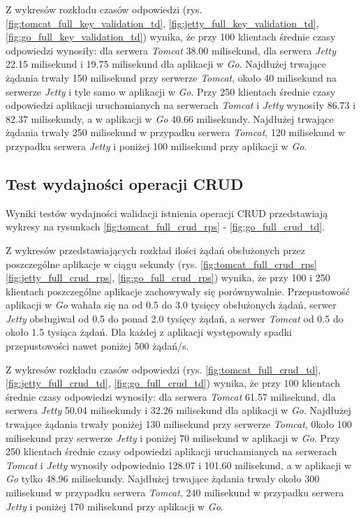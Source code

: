 Z wykresów rozkładu czasów odpowiedzi (rys. \ref{fig:tomcat_full_key_validation_td}, \ref{fig:jetty_full_key_validation_td}, \ref{fig:go_full_key_validation_td}) wynika, że przy 100 klientach średnie czasy odpowiedzi wynosiły: dla serwera \textsl{Tomcat} 38.00 milisekund, dla serwera \textsl{Jetty} 22.15 milisekund i 19.75 milisekund dla aplikacji w \textsl{Go}. Najdłużej trwające żądania trwały 150 milisekund przy serwerze  \textsl{Tomcat}, około 40 milisekund na serwerze \textsl{Jetty} i tyle samo w aplikacji w \textsl{Go}. Przy 250 klientach średnie czasy odpowiedzi aplikacji uruchamianych na serwerach \textsl{Tomcat} i \textsl{Jetty} wynosiły 86.73 i 82.37 milisekundy, a w aplikacji w \textsl{Go} 40.66 milisekundy. Najdłużej trwające żądania trwały 250 milisekund w przypadku serwera  \textsl{Tomcat}, 120 milisekund w przypadku serwera \textsl{Jetty} i poniżej 100  milisekund przy aplikacji w \textsl{Go}.

% 
\clearpage

\subsection{Test wydajności operacji CRUD}

Wyniki testów wydajności walidacji istnienia operacji CRUD przedstawiają wykresy na rysunkach \ref{fig:tomcat_full_crud_rps} - \ref{fig:go_full_crud_td}.

Z wykresów przedstawiających rozkład ilości żądań obsłużonych przez poszczególne aplikacje w ciągu sekundy (rys. \ref{fig:tomcat_full_crud_rps} \ref{fig:jetty_full_crud_rps}, \ref{fig:go_full_crud_rps}) wynika, że przy 100 i 250 klientach poszczególne aplikacje zachowywały się porównywalnie. Przepustowość aplikacji w \textsl{Go} wahała się na od 0.5 do 3.0 tysięcy obsłużonych żądań, serwer \textsl{Jetty} obsługiwał od 0.5 do ponad 2.0 tysięcy żądań, a serwer \textsl{Tomcat} od 0.5 do około 1.5 tysiąca żądań. Dla każdej z aplikacji występowały spadki przepustowości nawet poniżej 500 żądań/s.

Z wykresów rozkładu czasów odpowiedzi (rys. \ref{fig:tomcat_full_crud_td}, \ref{fig:jetty_full_crud_td}, \ref{fig:go_full_crud_td}) wynika, że przy 100 klientach średnie czasy odpowiedzi wynosiły: dla serwera \textsl{Tomcat} 61.57 milisekund, dla serwera \textsl{Jetty} 50.04 milisekundy i 32.26 milisekund dla aplikacji w \textsl{Go}. Najdłużej trwające żądania trwały poniżej 130 milisekund przy serwerze  \textsl{Tomcat}, 0koło 100 milisekund przy serwerze \textsl{Jetty} i poniżej 70 milisekund w aplikacji w \textsl{Go}. Przy 250 klientach średnie czasy odpowiedzi aplikacji uruchamianych na serwerach \textsl{Tomcat} i \textsl{Jetty}  wynosiły odpowiednio 128.07 i 101.60 milisekund, a w aplikacji w \textsl{Go} tylko 48.96 milisekundy. Najdłużej trwające żądania trwały około 300 milisekund w przypadku serwera  \textsl{Tomcat}, 240 milisekund w przypadku serwera \textsl{Jetty} i poniżej 170 milisekund przy aplikacji w \textsl{Go}.

